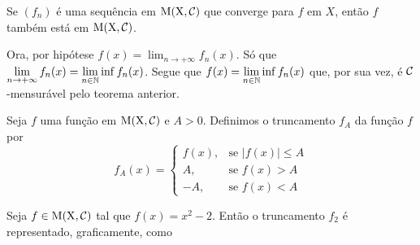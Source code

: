\begin{corollary}
	\label{cor:convergencia-de-uma-sequencia-mensuravel}
	Se $(f_n)$ é uma sequência em $\operatorname{M(X, \mathcal{C} )}$ que converge para $f$ em $X$, então
	$f$ também está em $\operatorname{M(X, \mathcal{C} )}$.
\end{corollary}
\begin{prova}
	Ora, por hipótese $\displaystyle f(x) = \lim_{n \to +\infty} f_n(x)$.
	Só que $\displaystyle \lim_{n \to +\infty} f_n(x) = \lim_{n \in \operatorname{\mathbb{N}}} \inf f_n(x)$.
	Segue que $\displaystyle f(x) = \lim_{n \in \operatorname{\mathbb{N}}} \inf f_n(x)$ que, por sua vez, é $\operatorname{\mathcal{C}}$-mensurável pelo teorema anterior.
\end{prova}

\begin{definition}
	Seja $f$ uma função em $\operatorname{M(X, \mathcal{C} )}$ e $A > 0$.
	Definimos o truncamento $f_A$ da função $f$ por
	$$ f_A(x) =
	\left\{\begin{array}{cc}
		f(x), & \textrm{se\ } |f(x)| \leq A \\
		A, & \textrm{se\ } f(x) > A \\
		-A, & \textrm{se\ } f(x) < A 
	\end{array}\right.
	$$
\end{definition}


\begin{example}
	Seja $f \in \operatorname{M(X, \mathcal{C} )}$ tal que $f(x) = x^2-2$.
	Então o truncamento $f_2$ é representado, graficamente, como
	\begin{figure}[h!]
		\centering
	\end{figure}
	
\end{example}

